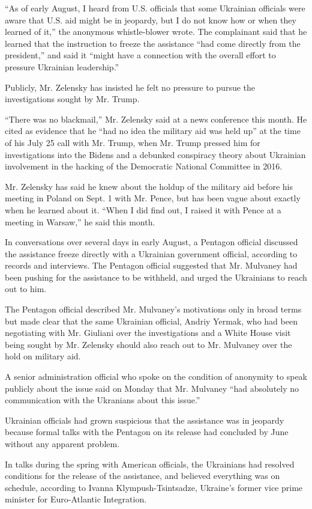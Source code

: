 ``As of early August, I heard from U.S. officials that some Ukrainian
officials were aware that U.S. aid might be in jeopardy, but I do not
know how or when they learned of it,'' the anonymous whistle-blower
wrote. The complainant said that he learned that the instruction to
freeze the assistance ``had come directly from the president,'' and said
it ``might have a connection with the overall effort to pressure
Ukrainian leadership.''

Publicly, Mr. Zelensky has insisted he felt no pressure to pursue the
investigations sought by Mr. Trump.

``There was no blackmail,'' Mr. Zelensky said at a news conference this
month. He cited as evidence that he ``had no idea the military aid was
held up'' at the time of his July 25 call with Mr. Trump, when Mr. Trump
pressed him for investigations into the Bidens and a debunked conspiracy
theory about Ukrainian involvement in the hacking of the Democratic
National Committee in 2016.

Mr. Zelensky has said he knew about the holdup of the military aid
before his meeting in Poland on Sept. 1 with Mr. Pence, but has been
vague about exactly when he learned about it. ``When I did find out, I
raised it with Pence at a meeting in Warsaw,'' he said this month.

In conversations over several days in early August, a Pentagon official
discussed the assistance freeze directly with a Ukrainian government
official, according to records and interviews. The Pentagon official
suggested that Mr. Mulvaney had been pushing for the assistance to be
withheld, and urged the Ukrainians to reach out to him.

The Pentagon official described Mr. Mulvaney's motivations only in broad
terms but made clear that the same Ukrainian official, Andriy Yermak,
who had been negotiating with Mr. Giuliani over the investigations and a
White House visit being sought by Mr. Zelensky should also reach out to
Mr. Mulvaney over the hold on military aid.

A senior administration official who spoke on the condition of anonymity
to speak publicly about the issue said on Monday that Mr. Mulvaney ``had
absolutely no communication with the Ukranians about this issue.''

Ukrainian officials had grown suspicious that the assistance was in
jeopardy because formal talks with the Pentagon on its release had
concluded by June without any apparent problem.

In talks during the spring with American officials, the Ukrainians had
resolved conditions for the release of the assistance, and believed
everything was on schedule, according to Ivanna Klympush-Tsintsadze,
Ukraine's former vice prime minister for Euro-Atlantic Integration.

